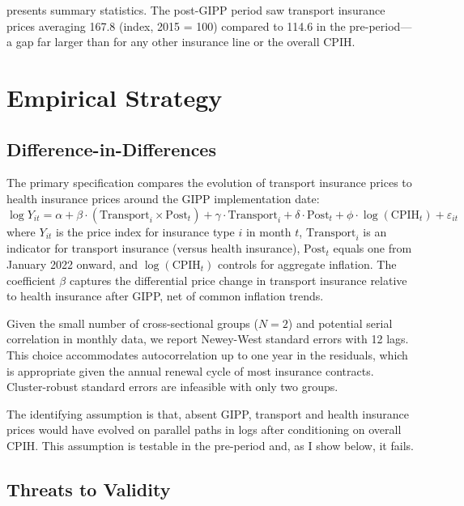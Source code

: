 \documentclass[12pt]{article}
\begin{document}
 presents summary statistics. The post-GIPP period saw transport insurance prices averaging 167.8 (index, 2015 = 100) compared to 114.6 in the pre-period---a gap far larger than for any other insurance line or the overall CPIH.




\section{Empirical Strategy}

\subsection{Difference-in-Differences}

The primary specification compares the evolution of transport insurance prices to health insurance prices around the GIPP implementation date:
\begin{equation}
\label{eq:did}
\log Y_{it} = \alpha + \beta \cdot (\text{Transport}_i \times \text{Post}_t) + \gamma \cdot \text{Transport}_i + \delta \cdot \text{Post}_t + \phi \cdot \log(\text{CPIH}_t) + \varepsilon_{it}
\end{equation}
where $Y_{it}$ is the price index for insurance type $i$ in month $t$, $\text{Transport}_i$ is an indicator for transport insurance (versus health insurance), $\text{Post}_t$ equals one from January 2022 onward, and $\log(\text{CPIH}_t)$ controls for aggregate inflation. The coefficient $\beta$ captures the differential price change in transport insurance relative to health insurance after GIPP, net of common inflation trends.

Given the small number of cross-sectional groups ($N=2$) and potential serial correlation in monthly data, we report Newey-West standard errors with 12 lags. This choice accommodates autocorrelation up to one year in the residuals, which is appropriate given the annual renewal cycle of most insurance contracts. Cluster-robust standard errors are infeasible with only two groups.

The identifying assumption is that, absent GIPP, transport and health insurance prices would have evolved on parallel paths in logs after conditioning on overall CPIH. This assumption is testable in the pre-period and, as I show below, it fails.

\subsection{Threats to Validity}
\end{document}
